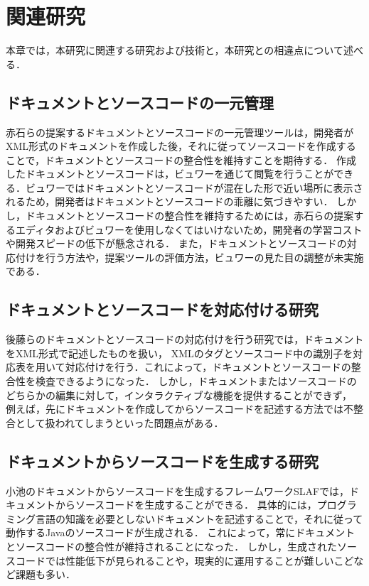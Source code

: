 \chapter{関連研究}
本章では，本研究に関連する研究および技術と，本研究との相違点について述べる．

\section{ドキュメントとソースコードの一元管理}
赤石らの提案するドキュメントとソースコードの一元管理ツール\cite{seigousei}は，開発者がXML形式のドキュメントを作成した後，それに従ってソースコードを作成することで，ドキュメントとソースコードの整合性を維持すことを期待する．
作成したドキュメントとソースコードは，ビュワーを通じて閲覧を行うことができる．ビュワーではドキュメントとソースコードが混在した形で近い場所に表示されるため，開発者はドキュメントとソースコードの乖離に気づきやすい．
しかし，ドキュメントとソースコードの整合性を維持するためには，赤石らの提案するエディタおよびビュワーを使用しなくてはいけないため，開発者の学習コストや開発スピードの低下が懸念される．
また，ドキュメントとソースコードの対応付けを行う方法や，提案ツールの評価方法，ビュワーの見た目の調整が未実施である．

\section{ドキュメントとソースコードを対応付ける研究}
後藤らのドキュメントとソースコードの対応付けを行う研究\cite{taiouduke}では，ドキュメントをXML形式で記述したものを扱い，
XMLのタグとソースコード中の識別子を対応表を用いて対応付けを行う．これによって，ドキュメントとソースコードの整合性を検査できるようになった．
しかし，ドキュメントまたはソースコードのどちらかの編集に対して，インタラクティブな機能を提供することができず，
例えば，先にドキュメントを作成してからソースコードを記述する方法では不整合として扱われてしまうといった問題点がある．

\section{ドキュメントからソースコードを生成する研究}
小池のドキュメントからソースコードを生成するフレームワークSLAF\cite{framework}では，ドキュメントからソースコードを生成することができる．
具体的には，プログラミング言語の知識を必要としないドキュメントを記述することで，それに従って動作するJavaのソースコードが生成される．
これによって，常にドキュメントとソースコードの整合性が維持されることになった．
しかし，生成されたソースコードでは性能低下が見られることや，現実的に運用することが難しいこどなど課題も多い．

